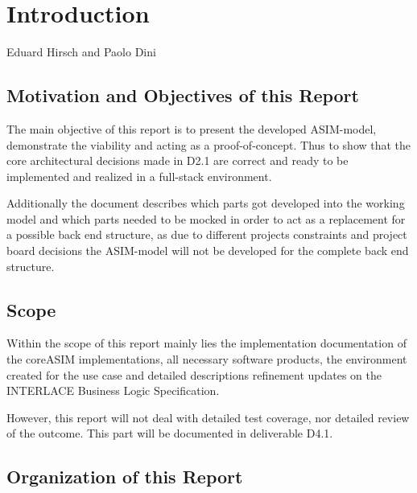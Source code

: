 \chapter{Introduction}
\label{ch:Introduction}

\vspace{-1cm}
\begin{center}
Eduard Hirsch and Paolo Dini
\end{center}


\section{Motivation and Objectives of this Report}

The main objective of this report is to present the developed ASIM-model,
demonstrate the viability and acting as a proof-of-concept. Thus to show
that the core architectural decisions made in D2.1 are correct and ready to be
implemented and realized in a full-stack environment.

Additionally the document describes which parts got developed into
the working model and which parts needed to be mocked in order to act as
a replacement for a possible back end structure, as due to different
projects constraints and project board decisions the ASIM-model will
not be developed for the complete back end structure.

\section{Scope}

Within the scope of this report mainly lies the implementation documentation 
of the coreASIM implementations, all necessary software products, the environment
created for the use case and detailed descriptions refinement updates on the
INTERLACE Business Logic Specification.

However, this report will not deal with detailed test coverage, nor detailed review of
the outcome. This part will be documented in deliverable D4.1.

\section{Organization of this Report}


\newpage











